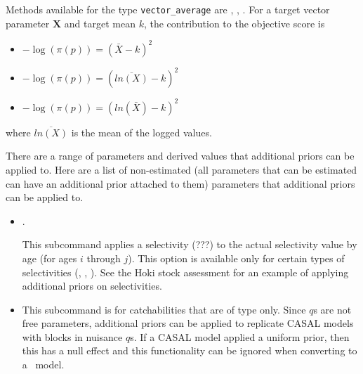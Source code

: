 Methods available for the type \texttt{vector\_average} are , , . For a target vector parameter $\textbf{X}$ and target mean $k$, the contribution to the objective score is

\begin{itemize}
	\item {}
	
	$- \log \left(\pi \left(p \right) \right) = \left(\bar{X} - k\right)^2$

	\item {}
	
	$- \log \left(\pi \left(p \right) \right) = \left(\overline{ln\left(X\right)} - k\right)^2$

	\item {}
	
	$- \log \left(\pi \left(p \right) \right) = \left(ln\left(\bar{X}\right) - k\right)^2$
\end{itemize}

where $\overline{ln\left(X\right)}$ is the mean of the logged values.

There are a range of parameters and derived values that additional priors can be applied to. Here are a list of non-estimated (all parameters that can be estimated can have an additional prior attached to them) parameters that additional priors can be applied to. 

\begin{itemize}
	\item {}.
	
	This subcommand applies a selectivity (???) to the actual selectivity value by age (for ages $i$ through $j$). This option is available only for certain types of selectivities (, , ). See the Hoki stock assessment for an example of applying additional priors on selectivities.
	
	\item {}
	
	This subcommand is for catchabilities that are of type  only. Since  $q$s are not free parameters, additional priors can be applied to replicate CASAL models with  blocks in nuisance $q$s. If a CASAL model applied a uniform prior, then this has a null effect and this functionality can be ignored when converting to a \CNAME\ model.
\end{itemize}

